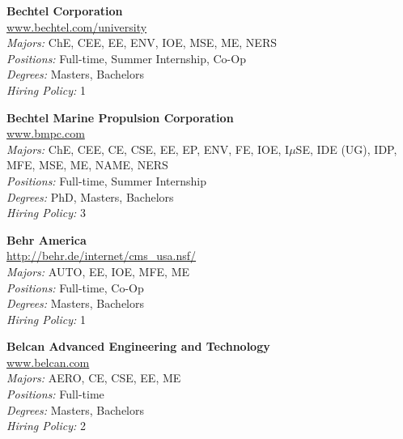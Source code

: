 \documentclass[twoside]{article}
\begin{document}
\begin{center}
\begin{multicols}{3}
\begin{minipage}{.9\columnwidth}{\Large\bf Bechtel Corporation }\\
	\url{www.bechtel.com/university}\\
	\emph{Majors:} ChE, CEE, EE, ENV, IOE, MSE, ME, NERS\\
	\emph{Positions:} Full-time, Summer Internship, Co-Op\\
	\emph{Degrees:} Masters, Bachelors\\
	\emph{Hiring Policy:} 1\\
\end{minipage}
 
\begin{minipage}{.9\columnwidth}{\Large\bf Bechtel Marine Propulsion Corporation }\\
	\url{www.bmpc.com}\\
	\emph{Majors:} ChE, CEE, CE, CSE, EE, EP, ENV, FE, IOE, I$\mu$SE, IDE (UG), IDP, MFE, MSE, ME, NAME, NERS\\
	\emph{Positions:} Full-time, Summer Internship\\
	\emph{Degrees:} PhD, Masters, Bachelors\\
	\emph{Hiring Policy:} 3\\
\end{minipage}
 
\begin{minipage}{.9\columnwidth}{\Large\bf Behr America }\\
	\url{http://behr.de/internet/cms_usa.nsf/}\\
	\emph{Majors:} AUTO, EE, IOE, MFE, ME\\
	\emph{Positions:} Full-time, Co-Op\\
	\emph{Degrees:} Masters, Bachelors\\
	\emph{Hiring Policy:} 1\\
\end{minipage}
 
\begin{minipage}{.9\columnwidth}{\Large\bf Belcan Advanced Engineering and Technology }\\
	\url{www.belcan.com}\\
	\emph{Majors:} AERO, CE, CSE, EE, ME\\
	\emph{Positions:} Full-time\\
	\emph{Degrees:} Masters, Bachelors\\
	\emph{Hiring Policy:} 2\\
\end{minipage}
 

\end{multicols}
\end{center}
\end{document}
